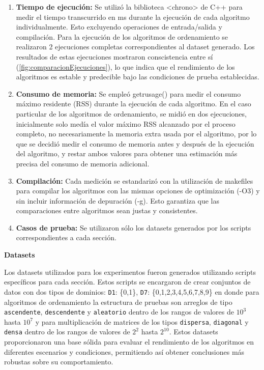 \begin{enumerate}
    \item \textbf{Tiempo de ejecución:} Se utilizó la biblioteca <chrono> de C++ para medir el tiempo transcurrido en ms durante la ejecución de cada algoritmo individualmente.
    Esto excluyendo operaciones de entrada/salida y compilación. Para la ejecución de los algoritmos de ordenamiento se realizaron 2 ejecuciones completas correspondientes al dataset
    generado. Los resultados de estas ejecuciones mostraron conscistencia entre sí (\cref{fig:comparacionEjecuciones}), lo que indica que el rendimiento de los algoritmos es estable y predecible bajo las condiciones de prueba establecidas.
    \item \textbf{Consumo de memoria:} Se empleó getrusage() para medir el consumo máximo residente (RSS) durante la ejecución de cada algoritmo. En el caso particular de los algoritmos de ordenamiento,
    se midió en dos ejecuciones, inicialmente solo medía el valor máximo RSS alcanzado por el proceso completo, no necesariamente la memoria extra usada por el algoritmo, por lo que 
se decidió medir el consumo de memoria antes y después de la ejecución del algoritmo, y restar ambos valores para obtener una estimación más precisa del consumo de memoria adicional.
    \item \textbf{Compilación:} Cada medición se estandarizó con la utilización de makefiles para compilar los algoritmos con las mismas opciones de optimización (-O3) y sin incluir 
    información de depuración (-g). Esto garantiza que las comparaciones entre algoritmos sean justas y consistentes.
    \item \textbf{Casos de prueba:} Se utilizaron sólo los datasets generados por los scripts correspondientes a cada sección.
\end{enumerate}



\textbf{Datasets}

Los datasets utilizados para los experimentos fueron generados utilizando scripts específicos para cada sección. 
Estos scripts se encargaron de crear conjuntos de datos con dos tipos de dominios: \texttt{D1}: \{0,1\}, \texttt{D7}: 
\{0,1,2,3,4,5,6,7,8,9\} en donde para algoritmos de ordenamiento la estructura de pruebas son arreglos de tipo \texttt{ascendente}, \texttt{descendente} y 
\texttt{aleatorio} dentro de los rangos de valores de $10^3$ hasta $10^7$ y para multiplicación de matrices de los tipos \texttt{dispersa}, 
\texttt{diagonal} y \texttt{densa} dentro de los rangos de valores de $2^2$ hasta $2^{10}$. Estos datasets proporcionaron una 
base sólida para evaluar el rendimiento de los algoritmos en diferentes escenarios y condiciones, permitiendo así obtener 
conclusiones más robustas sobre su comportamiento.
